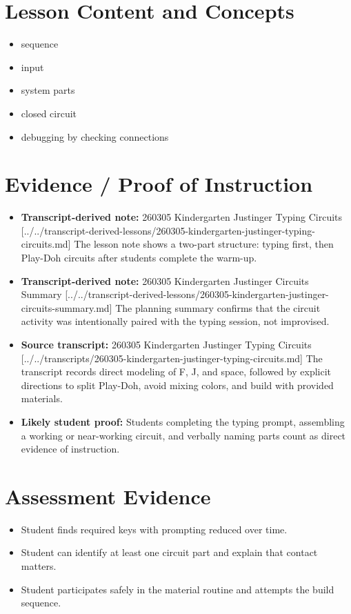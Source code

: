 \documentclass[11pt]{article}
\begin{document}
\section*{Lesson Content and Concepts}
\begin{itemize}[leftmargin=*]
\item sequence
\item input
\item system parts
\item closed circuit
\item debugging by checking connections
\end{itemize}

\section*{Evidence / Proof of Instruction}
\begin{itemize}[leftmargin=*]
\item \textbf{Transcript-derived note:} 260305 Kindergarten Justinger Typing Circuits [../../transcript-derived-lessons/260305-kindergarten-justinger-typing-circuits.md] The lesson note shows a two-part structure: typing first, then Play-Doh circuits after students complete the warm-up.
\item \textbf{Transcript-derived note:} 260305 Kindergarten Justinger Circuits Summary [../../transcript-derived-lessons/260305-kindergarten-justinger-circuits-summary.md] The planning summary confirms that the circuit activity was intentionally paired with the typing session, not improvised.
\item \textbf{Source transcript:} 260305 Kindergarten Justinger Typing Circuits [../../transcripts/260305-kindergarten-justinger-typing-circuits.md] The transcript records direct modeling of F, J, and space, followed by explicit directions to split Play-Doh, avoid mixing colors, and build with provided materials.
\item \textbf{Likely student proof:} Students completing the typing prompt, assembling a working or near-working circuit, and verbally naming parts count as direct evidence of instruction.
\end{itemize}

\section*{Assessment Evidence}
\begin{itemize}[leftmargin=*]
\item Student finds required keys with prompting reduced over time.
\item Student can identify at least one circuit part and explain that contact matters.
\item Student participates safely in the material routine and attempts the build sequence.
\end{itemize}
\end{document}
